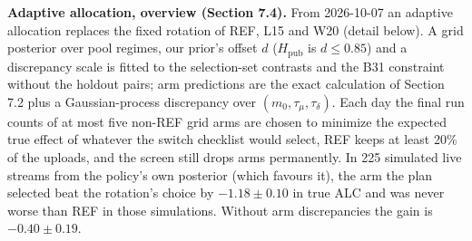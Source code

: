 \documentclass[
]{article}
\begin{document}
\textbf{Adaptive allocation, overview (Section 7.4).} From 2026-10-07 an
adaptive allocation replaces the fixed rotation of REF, L15 and W20
(detail below). A grid posterior over pool regimes, our prior's offset
\(d\) (\(H_{\mathrm{pub}}\) is \(d \le 0.85\)) and a discrepancy scale
is fitted to the selection-set contrasts and the B31 constraint without
the holdout pairs; arm predictions are the exact calculation of Section
7.2 plus a Gaussian-process discrepancy over
\((m_0, \tau_\mu, \tau_\delta)\). Each day the final run counts of at
most five non-REF grid arms are chosen to minimize the expected true
effect of whatever the switch checklist would select, REF keeps at least
20\% of the uploads, and the screen still drops arms permanently. In 225
simulated live streams from the policy's own posterior (which favours
it), the arm the plan selected beat the rotation's choice by
\(-1.18 \pm 0.10\) in true ALC and was never worse than REF in those
simulations. Without arm discrepancies the gain is \(-0.40 \pm 0.19\).
\end{document}
